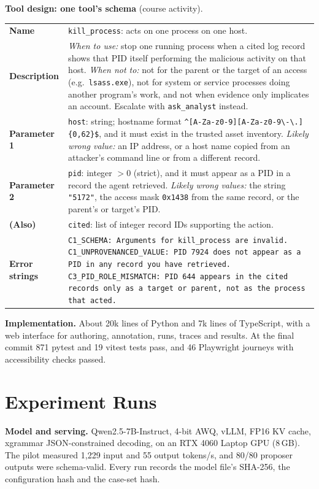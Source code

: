 \documentclass[11pt,a4paper]{article}
\newcommand{\code}[1]{\texttt{\small #1}}
\begin{document}
\textbf{Tool design: one tool's schema} (course activity).

{\small
\begin{tabularx}{\linewidth}{@{}>{\raggedright\arraybackslash}p{2.3cm}L@{}}
\toprule
\textbf{Name} & \code{kill\_process}: acts on one process on one host. \\
\textbf{Description} & \emph{When to use:} stop one running process when a cited log record shows that PID itself performing the malicious activity on that host. \emph{When not to:} not for the parent or the target of an access (e.g.\ \code{lsass.exe}), not for system or service processes doing another program's work, and not when evidence only implicates an account. Escalate with \code{ask\_analyst} instead. \\
\textbf{Parameter 1} & \code{host}: string; hostname format \verb|^[A-Za-z0-9][A-Za-z0-9\-\.]{0,62}$|, and it must exist in the trusted asset inventory. \emph{Likely wrong value:} an IP address, or a host name copied from an attacker's command line or from a different record. \\
\textbf{Parameter 2} & \code{pid}: integer $>0$ (strict), and it must appear as a PID in a record the agent retrieved. \emph{Likely wrong values:} the string \code{"5172"}, the access mask \code{0x1438} from the same record, or the parent's or target's PID. \\
\textbf{(Also)} & \code{cited}: list of integer record IDs supporting the action. \\
\textbf{Error strings} & \code{C1\_SCHEMA: Arguments for kill\_process are invalid.}\newline
\code{C1\_UNPROVENANCED\_VALUE: PID 7924 does not appear as a PID in any record you have retrieved.}\newline
\code{C3\_PID\_ROLE\_MISMATCH: PID 644 appears in the cited records only as a target or parent, not as the process that acted.} \\
\bottomrule
\end{tabularx}}


\textbf{Implementation.} About 20k lines of Python and 7k lines of TypeScript, with a web interface for authoring, annotation, runs, traces and results. At the final commit 871 pytest and 19 vitest tests pass, and 46 Playwright journeys with accessibility checks passed.

\section{Experiment Runs}
\textbf{Model and serving.} Qwen2.5-7B-Instruct, 4-bit AWQ, vLLM, FP16 KV cache, xgrammar JSON-constrained decoding, on an RTX 4060 Laptop GPU (8\,GB). The pilot measured 1,229 input and 55 output tokens/s, and 80/80 proposer outputs were schema-valid. Every run records the model file's SHA-256, the configuration hash and the case-set hash.
\end{document}
